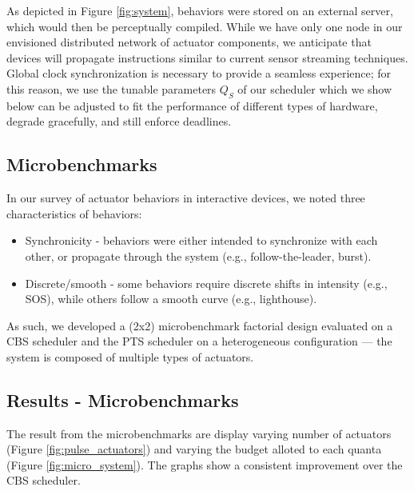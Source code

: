 \documentclass{sigchi}
\newcommand*{\schedule}[1]{{\textbf{\small{\fontfamily{cmss}\selectfont{#1}}}}}
\begin{document}
  
  As depicted in Figure \ref{fig:system}, behaviors were stored on an external server, which would then be perceptually compiled. While we have only one node in our envisioned distributed network of actuator components, we anticipate that devices will propagate instructions similar to current sensor streaming techniques. Global clock synchronization is necessary to provide a seamless experience; for this reason, we use the tunable parameters $Q_S$ of our \schedule{PS-T} scheduler which we show below can be adjusted to fit the performance of different types of hardware, degrade gracefully, and still enforce deadlines. 


  \subsection{Microbenchmarks}
  In our survey of actuator behaviors in interactive devices, we noted three characteristics of behaviors: 
    \begin{itemize}
    \item Synchronicity - behaviors were either intended to synchronize with each other, or propagate through the system (e.g., follow-the-leader, burst).
    \item Discrete/smooth - some behaviors require discrete shifts in intensity (e.g., SOS), while others follow a smooth curve (e.g., lighthouse). 
    \end{itemize}

  As such, we developed a (2x2) microbenchmark factorial design evaluated on a CBS scheduler and the PTS scheduler on a heterogeneous configuration --- the system is composed of multiple types of actuators. 

  \pagebreak
  \subsection{Results - Microbenchmarks}
  The result from the microbenchmarks are display varying number of actuators (Figure \ref{fig:pulse_actuators}) and varying the budget alloted to each quanta (Figure \ref{fig:micro_system}). The graphs show a consistent improvement over the CBS scheduler. 
\end{document}
